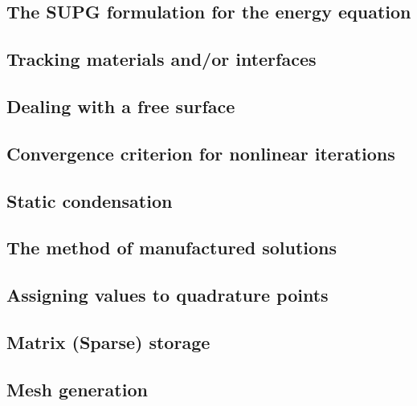 \documentclass[a4paper]{article}
\begin{document}
\subsection{The SUPG formulation for the energy equation}

\subsection{Tracking materials and/or interfaces}

\subsection{Dealing with a free surface}

\subsection{Convergence criterion for nonlinear iterations}

\subsection{Static condensation} 

\newpage %
\subsection{The method of manufactured solutions}  %

\newpage %
\subsection{Assigning values to quadrature points}  %

\newpage %
\subsection{Matrix (Sparse) storage}  %

\newpage %
\subsection{Mesh generation} \label{subsection_meshes}  %
\end{document}
